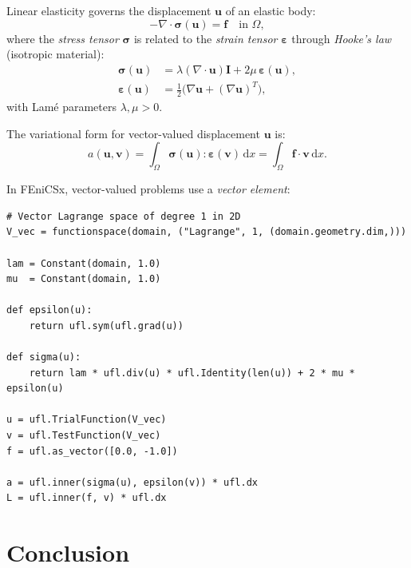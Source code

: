 \documentclass[11pt]{article}
\newcommand{\dx}{\,\mathrm{d}x}
\newcommand{\Div}{\nabla\cdot}
\newcommand{\domain}{\Omega}
\begin{document}
Linear elasticity governs the displacement $\mathbf{u}$ of an elastic body:
\begin{equation*}
  -\Div\boldsymbol{\sigma}(\mathbf{u}) = \mathbf{f}
  \quad \text{in } \domain,
\end{equation*}
where the \emph{stress tensor} $\boldsymbol{\sigma}$ is related to the
\emph{strain tensor} $\boldsymbol{\varepsilon}$ through
\emph{Hooke's law} (isotropic material):
\begin{align*}
  \boldsymbol{\sigma}(\mathbf{u})
    &= \lambda (\Div\mathbf{u})\mathbf{I}
      + 2\mu\,\boldsymbol{\varepsilon}(\mathbf{u}),\\
  \boldsymbol{\varepsilon}(\mathbf{u})
    &= \tfrac{1}{2}\bigl(\nabla\mathbf{u} + (\nabla\mathbf{u})^T\bigr),
\end{align*}
with Lam\'{e} parameters $\lambda, \mu > 0$.

The variational form for vector-valued displacement $\mathbf{u}$ is:
\begin{equation}
  a(\mathbf{u},\mathbf{v})
    = \int_\domain \boldsymbol{\sigma}(\mathbf{u}) : \boldsymbol{\varepsilon}(\mathbf{v}) \dx
    = \int_\domain \mathbf{f} \cdot \mathbf{v} \dx.
\end{equation}

In FEniCSx, vector-valued problems use a \emph{vector element}:
\begin{lstlisting}[style=python, caption={Setting up a vector function space for elasticity.}]
# Vector Lagrange space of degree 1 in 2D
V_vec = functionspace(domain, ("Lagrange", 1, (domain.geometry.dim,)))

lam = Constant(domain, 1.0)
mu  = Constant(domain, 1.0)

def epsilon(u):
    return ufl.sym(ufl.grad(u))

def sigma(u):
    return lam * ufl.div(u) * ufl.Identity(len(u)) + 2 * mu * epsilon(u)

u = ufl.TrialFunction(V_vec)
v = ufl.TestFunction(V_vec)
f = ufl.as_vector([0.0, -1.0])

a = ufl.inner(sigma(u), epsilon(v)) * ufl.dx
L = ufl.inner(f, v) * ufl.dx
\end{lstlisting}

\section*{Conclusion}
\end{document}
